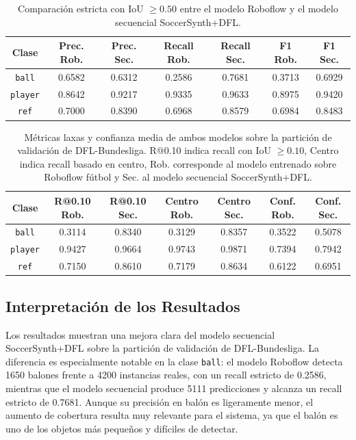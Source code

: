 \begin{table}[H]
\centering
\scriptsize
\begin{tabular}{c|c|c|c|c|c|c}
\textbf{Clase} & \textbf{Prec. Rob.} & \textbf{Prec. Sec.} & \textbf{Recall Rob.} & \textbf{Recall Sec.} & \textbf{F1 Rob.} & \textbf{F1 Sec.} \\
\hline\hline
\texttt{ball} & 0.6582 & 0.6312 & 0.2586 & 0.7681 & 0.3713 & 0.6929 \\
\hline
\texttt{player} & 0.8642 & 0.9217 & 0.9335 & 0.9633 & 0.8975 & 0.9420 \\
\hline
\texttt{ref} & 0.7000 & 0.8390 & 0.6968 & 0.8579 & 0.6984 & 0.8483 \\
\hline
\end{tabular}
\caption[Comparación estricta con IoU $\geq 0.50$]{
Comparación estricta con IoU $\geq 0.50$ entre el modelo Roboflow y el modelo secuencial SoccerSynth+DFL.
}
\label{tab:model_comparison_iou50}
\end{table}

\begin{table}[H]
\centering
\scriptsize
\renewcommand{\arraystretch}{1.15}
\begin{tabular}{c|c|c|c|c|c|c}
\textbf{Clase} & \textbf{R@0.10 Rob.} & \textbf{R@0.10 Sec.} & \textbf{Centro Rob.} & \textbf{Centro Sec.} & \textbf{Conf. Rob.} & \textbf{Conf. Sec.} \\
\hline\hline
\texttt{ball} & 0.3114 & 0.8340 & 0.3129 & 0.8357 & 0.3522 & 0.5078 \\
\hline
\texttt{player} & 0.9427 & 0.9664 & 0.9743 & 0.9871 & 0.7394 & 0.7942 \\
\hline
\texttt{ref} & 0.7150 & 0.8610 & 0.7179 & 0.8634 & 0.6122 & 0.6951 \\
\hline
\end{tabular}
\caption[Métricas laxas en la validación de DFL-Bundesliga]{
Métricas laxas y confianza media de ambos modelos sobre la partición de validación de DFL-Bundesliga. R@0.10 indica recall con IoU $\geq 0.10$, Centro indica recall basado en centro, Rob. corresponde al modelo entrenado sobre Roboflow fútbol y Sec. al modelo secuencial SoccerSynth+DFL.
}
\label{tab:model_comparison_soft}
\end{table}

\subsection{Interpretación de los Resultados}
Los resultados muestran una mejora clara del modelo secuencial SoccerSynth+DFL sobre la partición de validación de DFL-Bundesliga. La diferencia es especialmente notable en la clase \texttt{ball}: el modelo Roboflow detecta 1650 balones frente a 4200 instancias reales, con un recall estricto de 0.2586, mientras que el modelo secuencial produce 5111 predicciones y alcanza un recall estricto de 0.7681. Aunque su precisión en balón es ligeramente menor, el aumento de cobertura resulta muy relevante para el sistema, ya que el balón es uno de los objetos más pequeños y difíciles de detectar.

